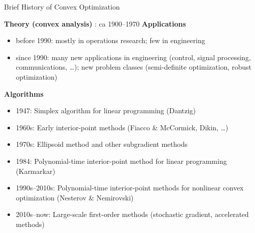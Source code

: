 \documentclass[9pt]{beamer}
\begin{document}
\begin{frame}{Brief History of Convex Optimization}

  \textbf{Theory (convex analysis)} : ca 1900--1970
  \vfill
  \textbf{Applications}
  \begin{itemize}
  \item before 1990: mostly in operations research; few in engineering
  \item since 1990: many new applications in engineering (control, signal processing, communications, \dots); new problem classes (semi-definite optimization, robust optimization)
  \end{itemize}
  \vfill
  \textbf{Algorithms}
  \begin{itemize}
  \item 1947: Simplex algorithm for linear programming (Dantzig)
  \item 1960s: Early interior-point methods (Fiacco \& McCormick, Dikin, \dots)
  \item 1970s: Ellipsoid method and other subgradient methods
  \item 1984: Polynomial-time interior-point method for linear programming (Karmarkar)
  \item 1990s--2010s: Polynomial-time interior-point methods for nonlinear convex optimization (Nesterov \& Nemirovski)
  \item 2010s--now: Large-scale first-order methods (stochastic gradient, accelerated methods)
  \end{itemize}
  
\end{frame}
\end{document}
